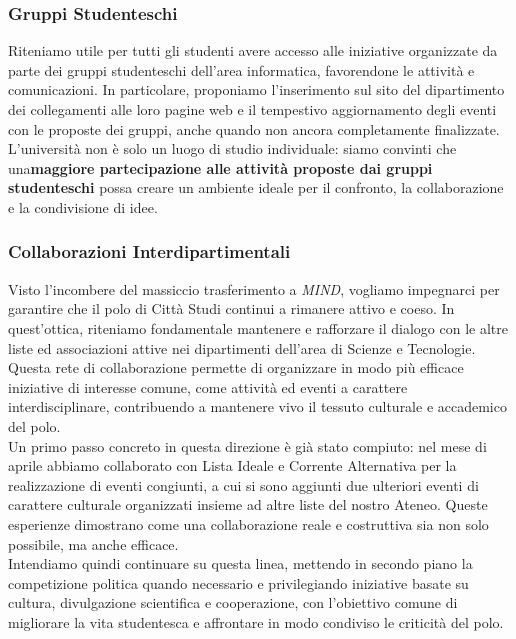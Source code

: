 \documentclass[12pt,a4paper]{article}
\begin{document}
\subsubsection{Gruppi Studenteschi}
Riteniamo utile per tutti gli studenti avere accesso alle iniziative organizzate da parte dei gruppi studenteschi dell'area informatica, favorendone le attività e comunicazioni.
In particolare, proponiamo l'inserimento sul sito del dipartimento dei collegamenti alle loro pagine web e il tempestivo aggiornamento degli eventi con le proposte dei gruppi, anche quando non ancora completamente finalizzate.
\\ L'università non è solo un luogo di studio individuale: siamo convinti che una\textbf{maggiore partecipazione alle attività proposte dai gruppi studenteschi} possa creare un ambiente ideale per il confronto, la collaborazione e la condivisione di idee.

\subsubsection{Collaborazioni Interdipartimentali}
Visto l'incombere del massiccio trasferimento a \textit{MIND}, vogliamo impegnarci per garantire che il polo di Città Studi continui a rimanere attivo e coeso. In quest’ottica, riteniamo fondamentale mantenere e rafforzare il dialogo con le altre liste ed associazioni attive nei dipartimenti dell’area di Scienze e Tecnologie.
\\ Questa rete di collaborazione permette di organizzare in modo più efficace iniziative di interesse comune, come attività ed eventi a carattere interdisciplinare, contribuendo a mantenere vivo il tessuto culturale e accademico del polo.
\\ Un primo passo concreto in questa direzione è già stato compiuto: nel mese di aprile abbiamo collaborato con Lista Ideale e Corrente Alternativa per la realizzazione di eventi congiunti, a cui si sono aggiunti due ulteriori eventi di carattere culturale organizzati insieme ad altre liste del nostro Ateneo. Queste esperienze dimostrano come una collaborazione reale e costruttiva sia non solo possibile, ma anche efficace.
\\ Intendiamo quindi continuare su questa linea, mettendo in secondo piano la competizione politica quando necessario e privilegiando iniziative basate su cultura, divulgazione scientifica e cooperazione, con l’obiettivo comune di migliorare la vita studentesca e affrontare in modo condiviso le criticità del polo.
\end{document}
